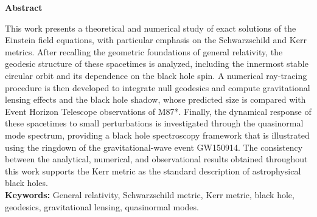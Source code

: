 	
	\clearpage
	\hypersetup{pageanchor=true}
	\setcounter{page}{1}
	\pagestyle{summary}
	
	\vspace*{\fill}
	\begin{center}{\Large \textbf{Abstract}}\end{center}
	\vspace{0.5cm}
	This work presents a theoretical and numerical study of exact solutions of the Einstein field equations, with particular emphasis on the Schwarzschild and Kerr metrics. After recalling the geometric foundations of general relativity, the geodesic structure of these spacetimes is analyzed, including the innermost stable circular orbit and its dependence on the black hole spin. A numerical ray-tracing procedure is then developed to integrate null geodesics and compute gravitational lensing effects and the black hole shadow, whose predicted size is compared with Event Horizon Telescope observations of M87*. Finally, the dynamical response of these spacetimes to small perturbations is investigated through the quasinormal mode spectrum, providing a black hole spectroscopy framework that is illustrated using the ringdown of the gravitational-wave event GW150914. The consistency between the analytical, numerical, and observational results obtained throughout this work supports the Kerr metric as the standard description of astrophysical black holes.
	\vspace{0.3cm}\\
	\noindent\textbf{Keywords:} General relativity, Schwarzschild metric, Kerr metric, black hole, geodesics, gravitational lensing, quasinormal modes.
	\vspace*{\fill}
	
	\newpage
	
